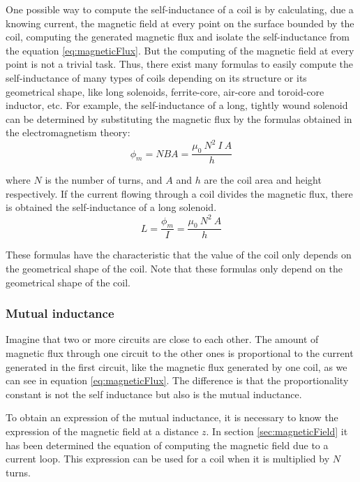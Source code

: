 One possible way to compute the self-inductance of a coil is by calculating, due a knowing current, the magnetic field at every point on the surface bounded by the coil, computing the generated magnetic flux and isolate the self-inductance from the equation \ref{eq:magneticFlux}\cite{tipler}. But the computing of the magnetic field at every point is not a trivial task. Thus, there exist many formulas to easily compute the self-inductance of many types of coils depending on its structure or its geometrical shape, like long solenoids, ferrite-core, air-core and toroid-core inductor, etc. For example, the self-inductance of a long, tightly wound solenoid can be determined by substituting the magnetic flux by the formulas obtained in the electromagnetism theory:
\begin{equation}
\phi_m = NBA = \frac{\mu_0\:N^2\:I\:A}{h}
\end{equation}

where $N$ is the number of turns, and $A$ and $h$ are the coil area and height respectively. If the current flowing through a coil divides the magnetic flux, there is obtained the self-inductance of a long solenoid.
\begin{equation}
L = \frac{\phi_m}{I} = \frac{\mu_0\:N^2\:A}{h}
\end{equation}

These formulas have the characteristic that the value of the coil only depends on the geometrical shape of the coil.
Note that these formulas only depend on the geometrical shape of the coil.

			\subsubsection{Mutual inductance}
Imagine that two or more circuits are close to each other. The amount of magnetic flux through one circuit to the other ones is proportional to the current generated in the first circuit, like the magnetic flux generated by one coil, as we can see in equation \ref{eq:magneticFlux}. The difference is that the proportionality constant is not the self inductance but also is the mutual inductance.

To obtain an expression of the mutual inductance, it is  necessary to know the expression of the magnetic field at a distance $z$. In section \ref{sec:magneticField} it has been determined the equation of computing the magnetic field due to a current loop. This expression can be used for a coil when it is multiplied by $N$ turns. 

